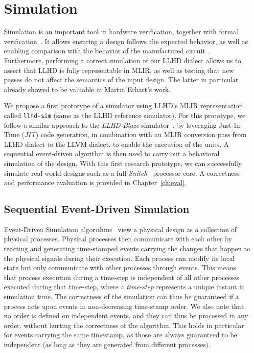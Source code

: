 
\chapter{Simulation}
\label{ch:sim}

Simulation is an important tool in hardware verification, together with formal verification~\cite{YuanLu2001, Kumar1998}. It allows ensuring a design follows the expected behavior, as well as enabling comparison with the behavior of the manufactured circuit~\cite{Ashenden1994}.
Furthermore, performing a correct simulation of our LLHD dialect allows us to assert that LLHD is fully representable in MLIR, as well as testing that new passes do not affect the semantics of the input design. The latter in particular already showed to be valuable in Martin Erhart's work.

We propose a first prototype of a simulator using LLHD's MLIR representation, called \texttt{llhd-sim} (same as the LLHD reference simulator). For this prototype, we follow a similar approach to the \textit{LLHD-Blaze} simulator~\cite{Schuiki2020}, by leveraging Just-In-Time (\textit{JIT}) code generation, in combination with an MLIR conversion pass from LLHD dialect to the LLVM dialect, to enable the execution of the units. A sequential event-driven algorithm is then used to carry out a behavioral simulation of the design. With this first research prototype, we can successfully simulate real-world designs such as a full \textit{Snitch}~\cite{Zaruba2020} processor core. A correctness and performance evaluation is provided in Chapter~\ref{ch:eval}.


\section{Sequential Event-Driven Simulation}
Event-Driven Simulation algorithms~\cite{Ashenden1994} view a physical design as a collection of physical processes. Physical processes then communicate with each other by reacting and generating time-stamped events carrying the changes that happen to the physical signals during their execution. Each process can modify its local state but only communicate with other processes through events. This means that process execution during a time-step is independent of all other processes executed during that time-step, where a \textit{time-step} represents a unique instant in simulation time. The correctness of the simulation can thus be guaranteed if a process acts upon events in non-decreasing time-stamp order. We also note that no order is defined on independent events, and they can thus be processed in any order, without hurting the correctness of the algorithm. This holds in particular for events carrying the same timestamp, as those are always guaranteed to be independent (as long as they are generated from different processes).

